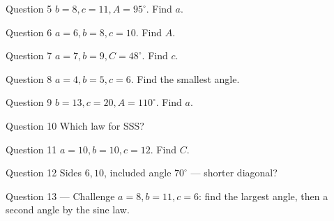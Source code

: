 \documentclass[11pt]{article}
\begin{document}
\begin{qbox}{Question 5}
$b=8,c=11,A=95^\circ$. Find $a$.\workspace{2.4cm}
\end{qbox}

\begin{qbox}{Question 6}
$a=6,b=8,c=10$. Find $A$.\workspace{2.4cm}
\end{qbox}

\begin{qbox}{Question 7}
$a=7,b=9,C=48^\circ$. Find $c$.\workspace{2.4cm}
\end{qbox}

\begin{qbox}{Question 8}
$a=4,b=5,c=6$. Find the smallest angle.\workspace{2.4cm}
\end{qbox}

\begin{qbox}{Question 9}
$b=13,c=20,A=110^\circ$. Find $a$.\workspace{2.4cm}
\end{qbox}

\begin{qbox}{Question 10}
Which law for SSS?\workspace{2.4cm}
\end{qbox}

\begin{qbox}{Question 11}
$a=10,b=10,c=12$. Find $C$.\workspace{2.4cm}
\end{qbox}

\begin{qbox}{Question 12}
Sides $6,10$, included angle $70^\circ$ — shorter diagonal?\workspace{2.4cm}
\end{qbox}

\begin{qbox}{Question 13 --- Challenge}
$a=8,b=11,c=6$: find the largest angle, then a second angle by the sine law.\workspace{3.4cm}
\end{qbox}

\clearpage
{}
\end{document}
